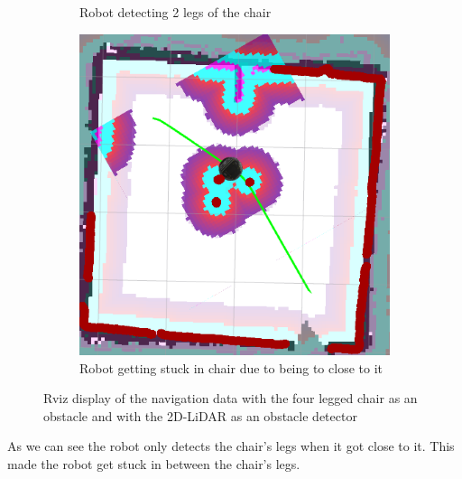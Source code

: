 \begin{figure}[ht!]
\begin{subfigure}[t]{0.32\linewidth}
    \caption{Robot detecting 2 legs of the chair}
    \label{fig::rviznchairscan2}
  \end{subfigure}
   \begin{subfigure}[t]{0.3\linewidth}
    \includegraphics[width=\linewidth]{imgs/chapter5/rviznchairscan2.png}
    \caption{Robot getting stuck in chair due to being to close to it}
    \label{fig::rviznchairscan3}
  \end{subfigure}
  \caption[Navigation data with the four legged chair as an obstacle with \ac{LiDAR}]{Rviz display of the navigation data with the four legged chair as an obstacle and with the 2D-\ac{LiDAR} as an obstacle detector}
  \label{fig:rviznchairscan}
\end{figure}
 As we can see the robot only detects the chair's legs when it got close to it. This made the robot get stuck in between the chair's legs.

